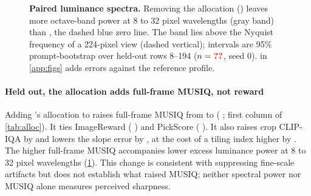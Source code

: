 \begin{figure}
\vspace{-12pt}
\centering
{}
\caption{\textbf{Paired luminance spectra.} Removing the allocation (\tempsb) leaves more octave-band power at 8 to 32 pixel wavelengths (gray band) than \segaofficial, the dashed blue zero line. The band lies above the Nyquist frequency of a 224-pixel view (dashed vertical); intervals are 95\% prompt-bootstrap over held-out rows 8--194 ($n=\N{ho@nprompts}$, seed 0).  in \cref{app:figs} adds errors against the reference profile.}
\label{fig:spectrum_main}
\vspace{-10pt}
\end{figure}
\paragraph{Held out, the allocation adds full-frame MUSIQ, not reward}
Adding \sega's allocation to \tempsb{} raises full-frame MUSIQ from  to  ( ; first column of \cref{tab:alloc}). It ties ImageReward ( ) and PickScore ( ). It also raises crop CLIP-IQA by   and lowers the slope error by  , at the cost of a tiling index higher by  . The higher full-frame MUSIQ accompanies lower excess luminance power at 8 to 32 pixel wavelengths (\cref{fig:spectrum_main}). This change is consistent with suppressing fine-scale artifacts but does not establish what raised MUSIQ; neither spectral power nor MUSIQ alone measures perceived sharpness.

